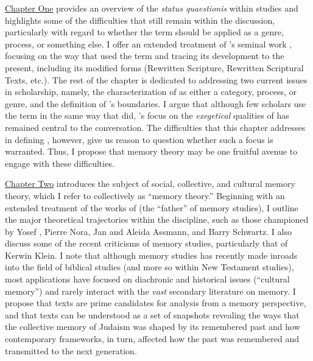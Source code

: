 \hyperref[chap:rwb]{Chapter One} provides an overview of the \emph{status quaestionis} within \rwb studies and highlights some of the difficulties that still remain within the discussion, particularly with regard to whether the term should be applied as a genre, process, or something else. I offer an extended treatment of \vermes's seminal work , focusing on the way that \vermes used the term and tracing its development to the present, including its modified forms (Rewritten Scripture, Rewritten Scriptural Texts, etc.). The rest of the chapter is dedicated to addressing two current issues in \rwb scholarship, namely, the characterization of \rwb as either a category, process, or genre, and the definition of \rwb's boundaries. I argue that although few scholars use the term \rwb in the same way that \vermes did, \vermes's focus on the \emph{exegetical} qualities of \rwb has remained central to the conversation. The difficulties that this chapter addresses in defining \rwb, however, give us reason to question whether such a focus is warranted. Thus, I propose that memory theory may be one fruitful avenue to engage with these difficulties.

\hyperref[chap:memory]{Chapter Two} introduces the subject of social, collective, and cultural memory theory, which I refer to collectively as ``memory theory.'' Beginning with an extended treatment of the works of \Halbwachs (the ``father'' of memory studies), I outline the major theoretical trajectories within the discipline, such as those championed by Yosef \yerushalmi, Pierre Nora, Jan and Aleida Assmann, and Barry Schwartz. I also discuss some of the recent criticisms of memory studies, particularly that of Kerwin Klein. I note that although memory studies has recently made inroads into the field of biblical studies (and more so within New Testament studies), most applications have focused on diachronic and historical issues (``cultural memory'') and rarely interact with the \emph{vast} secondary literature on memory. I propose that \rwb texts are prime candidates for analysis from a memory perspective, and that \rwb texts can be understood as a set of snapshots revealing the ways that the collective memory of \secondtemple Judaism was shaped by its remembered past and how contemporary frameworks, in turn, affected how the past was remembered and transmitted to the next generation.

